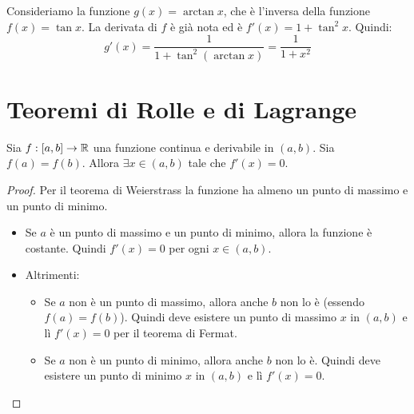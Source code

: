\begin{example}
Consideriamo la funzione $g(x) = \arctan x$, che è l'inversa della funzione $f(x) = \tan x$. La derivata di $f$ è già nota ed è $f'(x) = 1 + \tan^2 x$. Quindi:
\begin{equation*}
g'(x) = \frac{1}{1 + \tan^2 (\arctan x)} = \frac{1}{1 + x^2}
\end{equation*}
\end{example}

\section{Teoremi di Rolle e di Lagrange}

\begin{theorem}
Sia $f:[a,b] \to \mathbb R$ una funzione continua e derivabile in $(a,b)$. Sia $f(a) = f(b)$. Allora $\exists x \in (a,b)$ tale che $f'(x) = 0$.
\end{theorem}

\begin{center}
\end{center}

\begin{proof}
Per il teorema di Weierstrass la funzione ha almeno un punto di massimo e un punto di minimo.
\begin{itemize}
\item Se $a$ è un punto di massimo e un punto di minimo, allora la funzione è costante. Quindi $f'(x) = 0$ per ogni $x \in (a,b)$.
\item Altrimenti:
\begin{itemize}
\item Se $a$ non è un punto di massimo, allora anche $b$ non lo è (essendo $f(a) = f(b)$). Quindi deve esistere un punto di massimo $x$ in $(a,b)$ e lì $f'(x) = 0$ per il teorema di Fermat.
\item Se $a$ non è un punto di minimo, allora anche $b$ non lo è. Quindi deve esistere un punto di minimo $x$ in $(a,b)$ e lì $f'(x) = 0$.
\end{itemize}
\end{itemize}
\end{proof}

